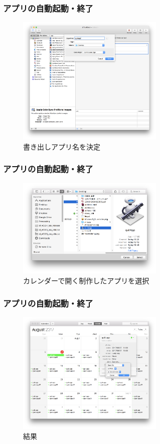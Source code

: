 \documentclass[10pt, dvipdfmx]{beamer}
\begin{document}
        \begin{frame}
            \frametitle{アプリの自動起動・終了}
                \begin{figure}[htb]
                    \includegraphics[width=70mm]{images/app-16.png}
                    \caption{書き出しアプリ名を決定}
                    \label{fig:23}
                \end{figure}
        \end{frame}

        \begin{frame}
            \frametitle{アプリの自動起動・終了}
                \begin{figure}[htb]
                    \includegraphics[width=70mm]{images/app-17.png}
                    \caption{カレンダーで開く制作したアプリを選択}
                    \label{fig:24}
                \end{figure}
        \end{frame}

        \begin{frame}
            \frametitle{アプリの自動起動・終了}
                \begin{figure}[htb]
                    \includegraphics[width=70mm]{images/app-18.png}
                    \caption{結果}
                    \label{fig:25}
                \end{figure}
        \end{frame}
\end{document}
